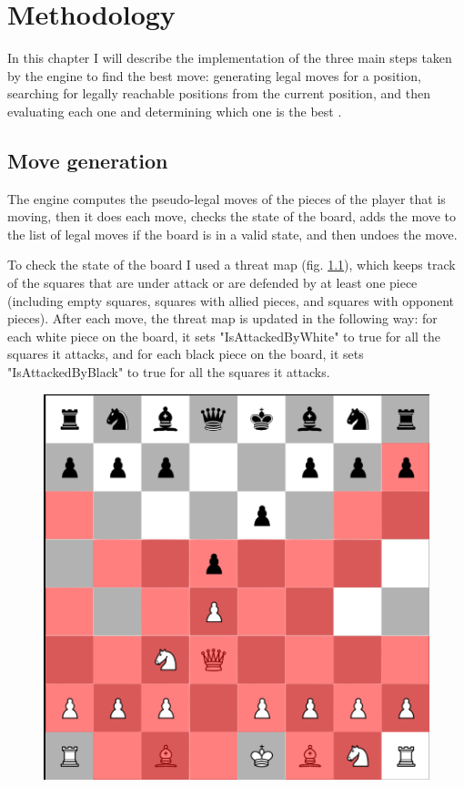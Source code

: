 \chapter{Methodology}
\label{chap:ch4}

In this chapter I will describe the implementation of the three main steps taken by the engine to find the best move: generating legal moves for a position, searching for legally reachable positions from the current position, and then evaluating each one and determining which one is the best \cite{marsland1986review}.


\section{Move generation}
\label{sec:ch4sec1}

The engine computes the pseudo-legal moves of the pieces of the player that is moving, then it does each move, checks the state of the board, adds the move to the list of legal moves if the board is in a valid state, and then undoes the move.

To check the state of the board I used a threat map (fig. \ref{fig:threatMap}), which keeps track of the squares that are under attack or are defended by at least one piece (including empty squares, squares with allied pieces, and squares with opponent pieces). After each move, the threat map is updated in the following way: for each white piece on the board, it sets "IsAttackedByWhite" to true for all the squares it attacks, and for each black piece on the board, it sets "IsAttackedByBlack" to true for all the squares it attacks.

\begin{figure}
  \centering
  \includegraphics[scale=0.55]{figures/white-threat-map.png}
  \label{fig:threatMap}
\end{figure}

